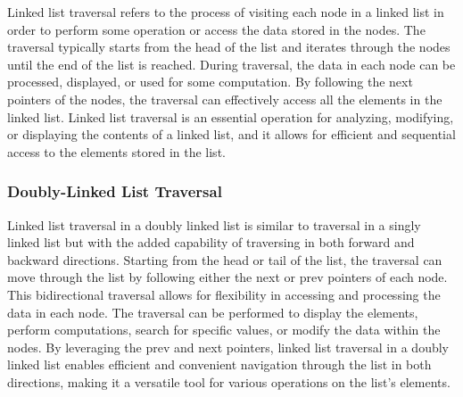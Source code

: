 Linked list traversal refers to the process of visiting each node in a linked list in order to perform some operation or access the data stored in the nodes. The traversal typically starts from the head of the list and iterates through the nodes until the end of the list is reached. During traversal, the data in each node can be 
processed, displayed, or used for some computation. By following the next pointers of the nodes, the traversal can effectively access all the elements in the linked list. Linked list traversal is an essential operation for analyzing, modifying, or displaying the contents of a linked list, and it allows for efficient and sequential 
access to the elements stored in the list.

\subsubsection{Doubly-Linked List Traversal}

Linked list traversal in a doubly linked list is similar to traversal in a singly linked list but with the added capability of traversing in both forward and backward directions. Starting from the head or tail of the list, the traversal can move through the list by following either the next or prev pointers of each node. This bidirectional 
traversal allows for flexibility in accessing and processing the data in each node. The traversal can be performed to display the elements, perform computations, search for specific values, or modify the data within the nodes. By leveraging the prev and next pointers, linked list traversal in a doubly linked list enables efficient and convenient 
navigation through the list in both directions, making it a versatile tool for various operations on the list's elements.

